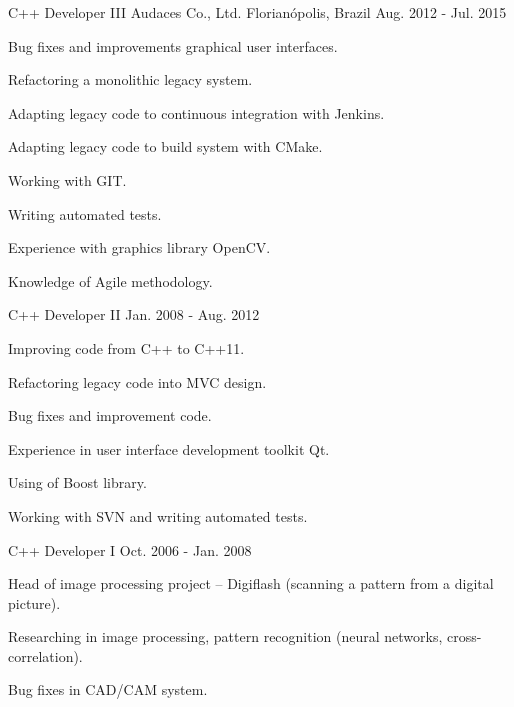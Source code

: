 \begin{cventries}
  \cventry
    {C++ Developer III} %
    {Audaces Co., Ltd.} %
    {Florianópolis, Brazil} %
    {Aug. 2012 - Jul. 2015} %
    {
      \begin{cvitems} %
        \item {Bug fixes and improvements graphical user interfaces.}
        \item {Refactoring a monolithic legacy system.}
        \item {Adapting legacy code to continuous integration with Jenkins.}
        \item {Adapting legacy code to build system with CMake.}
        \item {Working with GIT.}
        \item {Writing automated tests.}
        \item {Experience with graphics library OpenCV.}
        \item {Knowledge of Agile methodology.}
      \end{cvitems}
    }

    \cventry
    {C++ Developer II} %
    {} %
    {} %
    {Jan. 2008 - Aug. 2012} %
    {
      \begin{cvitems} %
        \item {Improving code from C++ to C++11.}
        \item {Refactoring legacy code into MVC design.}
        \item {Bug fixes and improvement code.}
        \item {Experience in user interface development toolkit Qt.}
        \item {Using of Boost library.}
        \item {Working with SVN and writing automated tests.}
      \end{cvitems}
    }

    \cventry
    {C++ Developer I} %
    {} %
    {} %
    {Oct. 2006 - Jan. 2008} %
    {
      \begin{cvitems} %
        \item {Head of image processing project – Digiflash (scanning a pattern from a digital picture).}
        \item {Researching in image processing, pattern recognition (neural networks, cross-correlation).}
        \item {Bug fixes in CAD/CAM system.}
      \end{cvitems}
    }

\end{cventries}
